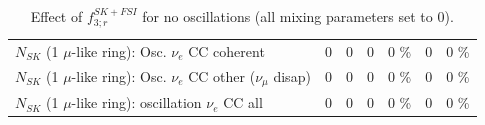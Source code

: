 \begin{table}
\begin{tabular}{| l | r | r | r  r | r  r |}
                          $N_{SK}$ (1 $\mu$-like ring): Osc. $\nu_e$ CC coherent &               0 &               0 &               0 &        0 \%  &               0 &        0 \%  \\ 
           $N_{SK}$ (1 $\mu$-like ring): Osc. $\nu_e$ CC other ($\nu_\mu$ disap) &               0 &               0 &               0 &        0 \%  &               0 &        0 \%  \\ 
                        $N_{SK}$ (1 $\mu$-like ring): oscillation $\nu_e$ CC all &               0 &               0 &               0 &        0 \%  &               0 &        0 \%  \\ 
\hline
\hline
\end{tabular}
\caption{ Effect of $f_{3; r}^{SK+FSI}$ for no oscillations (all mixing parameters set to 0). }
\label{tab:num_skdetfsi_003_1RmuT_3f_osc_t13:0_spectralreco_spectraltrue}
\end{table}
\clearpage

